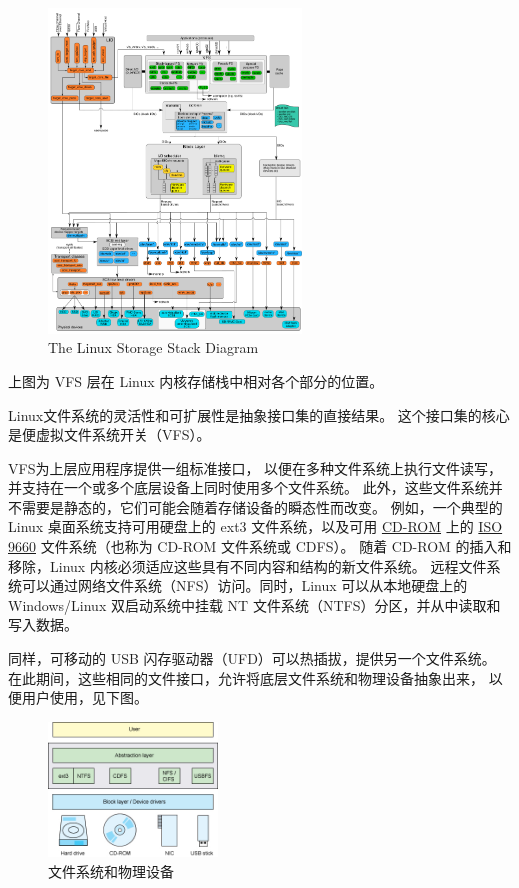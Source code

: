 \documentclass[UTF8,a4paper]{ctexart}
\begin{document}
\begin{figure}[H]
    \centering
    \includegraphics[width=0.6\textwidth]{The_Linux_Storage_Stack_Diagram.png}
    \caption{The Linux Storage Stack Diagram}
\end{figure}

上图为 VFS 层在 Linux 内核存储栈中相对各个部分的位置。

Linux文件系统的灵活性和可扩展性是抽象接口集的直接结果。
这个接口集的核心是便虚拟文件系统开关（VFS）。

VFS为上层应用程序提供一组标准接口，
以便在多种文件系统上执行文件读写，
并支持在一个或多个底层设备上同时使用多个文件系统。
此外，这些文件系统并不需要是静态的，它们可能会随着存储设备的瞬态性而改变。
例如，一个典型的
Linux 桌面系统支持可用硬盘上的 ext3 文件系统，以及可用
\href{https://en.wikipedia.org/wiki/CD-ROM}{CD-ROM} 上的
\href{https://en.wikipedia.org/wiki/ISO_9660}{ISO 9660} 
文件系统（也称为
CD-ROM 文件系统或 CDFS）。
随着 CD-ROM 的插入和移除，Linux
内核必须适应这些具有不同内容和结构的新文件系统。
远程文件系统可以通过网络文件系统（NFS）访问。同时，Linux
可以从本地硬盘上的 Windows/Linux 双启动系统中挂载 NT
文件系统（NTFS）分区，并从中读取和写入数据。

同样，可移动的 USB
闪存驱动器（UFD）可以热插拔，提供另一个文件系统。
在此期间，这些相同的文件接口，允许将底层文件系统和物理设备抽象出来，
以便用户使用，见下图。

\begin{figure}[H]
    \centering
    \includegraphics[width=0.4\textwidth]{figure1.jpg}
    \caption{文件系统和物理设备}
\end{figure}
\end{document}
